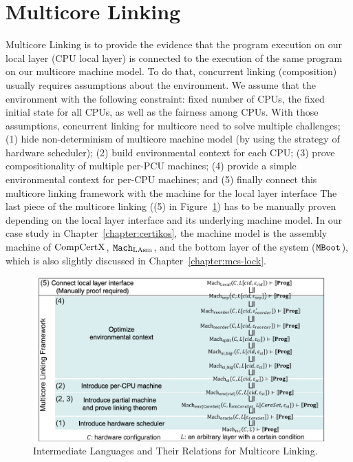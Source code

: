 \section{Multicore Linking}
\label{chapter:linking:sec:multicore-linking}

Multicore Linking is to provide the evidence that the program execution on
our local layer (CPU local layer) is connected to the execution of the same program on our multicore machine model. 
To do that, concurrent linking (composition) usually requires assumptions about the environment. 
We assume that the environment with the following constraint:
fixed number of CPUs, the fixed initial state for all CPUs,
as well as the fairness among CPUs.
With those assumptions, 
concurrent linking for multicore need to solve multiple challenges;
(1) hide non-determinism of multicore machine model (by using the strategy of hardware scheduler);
(2) build environmental context for each CPU;
(3) prove compositionality of multiple per-PCU machines;
(4) provide a simple environmental context for per-CPU machines;
and (5) finally connect this multicore linking framework with the machine for the local layer interface
The last piece of the multicore linking ((5) in Figure~\ref{fig:chapter:conlink:intermediate-languages-and-their-relationsihps-for-multicore-linking}) 
has to be manually proven depending on the local layer interface and its underlying machine model. 
In our case study in Chapter~\ref{chapter:certikos}, the machine model is the assembly machine of $\mathrm{CompCertX}$, ${\mathrm{\texttt{Mach}}}_{\mathrm{LAsm}}$,
and the bottom layer of the system (${\mathrm{\texttt{MBoot}}}$), which is also slightly discussed in Chapter~\ref{chapter:mcs-lock}.
\begin{figure}
\begin{center}
\includegraphics[width=\textwidth, page=1]{figs/conlink/concurrent_linking}
\end{center}
\caption{Intermediate Languages and Their Relations for Multicore Linking.}
\label{fig:chapter:conlink:intermediate-languages-and-their-relationsihps-for-multicore-linking}
\end{figure}
